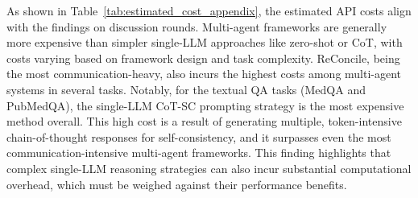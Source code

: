 \documentclass{article}
\begin{document}
\begin{table}[!ht]
\centering
\caption{\textit{Estimated cost (USD) on the selected test set for Task 1, based on the DeepSeek API pricing strategy.}}
\label{tab:estimated_cost_appendix}
\end{table}

As shown in Table~\ref{tab:estimated_cost_appendix}, the estimated API costs align with the findings on discussion rounds. Multi-agent frameworks are generally more expensive than simpler single-LLM approaches like zero-shot or CoT, with costs varying based on framework design and task complexity. ReConcile, being the most communication-heavy, also incurs the highest costs among multi-agent systems in several tasks. Notably, for the textual QA tasks (MedQA and PubMedQA), the single-LLM CoT-SC prompting strategy is the most expensive method overall. This high cost is a result of generating multiple, token-intensive chain-of-thought responses for self-consistency, and it surpasses even the most communication-intensive multi-agent frameworks. This finding highlights that complex single-LLM reasoning strategies can also incur substantial computational overhead, which must be weighed against their performance benefits.
\end{document}
